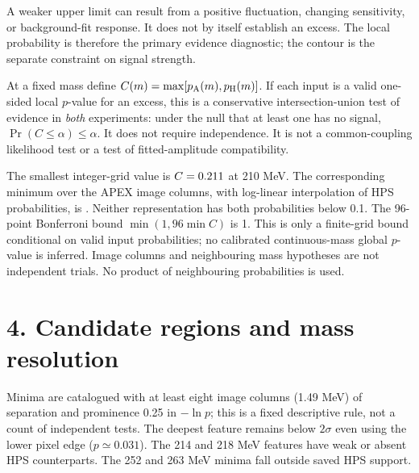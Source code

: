 \documentclass[10pt,letterpaper]{article}
\begin{document}
A weaker upper limit can result from a positive fluctuation, changing sensitivity,
or background-fit response. It does not by itself establish an excess. The local
probability is therefore the primary evidence diagnostic; the contour is the
separate constraint on signal strength.

At a fixed mass define $C(m)=\max[p_{\rm A}(m),p_{\rm H}(m)]$. If each input
is a valid one-sided local $p$-value for an excess, this is a conservative
intersection-union test of evidence in \emph{both} experiments: under the null
that at least one has no signal, $\Pr(C\leq\alpha)\leq\alpha$.
It does not require independence. It is not a common-coupling likelihood test
or a test of fitted-amplitude compatibility.

The smallest integer-grid value is $C=0.211$ at 210 MeV.
The corresponding minimum over the APEX image columns, with log-linear
interpolation of HPS probabilities, is \DenseConcordance.
Neither representation has both probabilities below 0.1. The 96-point
Bonferroni bound $\min(1,96\min C)$ is 1. This is only a finite-grid bound
conditional on valid input probabilities; no calibrated continuous-mass global
$p$-value is inferred. Image columns and neighbouring mass hypotheses are not
independent trials. No product of neighbouring probabilities is used.

\newpage
\section*{4. Candidate regions and mass resolution}
\begin{center}\small

\end{center}
Minima are catalogued with at least eight image columns (1.49 MeV) of separation
and prominence 0.25 in $-\ln p$; this is a fixed descriptive rule, not a count of
independent tests. The deepest feature remains below $2\sigma$ even using the
lower pixel edge ($p\simeq0.031$). The 214 and 218 MeV features have weak or
absent HPS counterparts. The 252 and 263 MeV minima fall outside saved HPS support.
\end{document}
